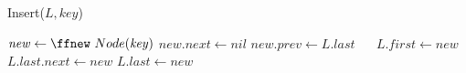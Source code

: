 \documentclass[20pt,a4paper,landscape]{extarticle}
\begin{document}
\SetInd{0em}{0em}
\pagestyle{empty}
\noindent


\begin{procedure}
\LinesNumberedHidden
{}
\caption{Insert($L,key$)}
\BlankLine
$\mathit{new} \leftarrow \ffnew~ Node(\mathit{key})$ \;
$\mathit{new.next} \leftarrow \mathit{nil}$ \;
$\mathit{new.prev} \leftarrow \mathit{L.last}$ \;
 { }{ }
$\mathit{L.first} \leftarrow \mathit{new}$ \;
$\mathit{L.last.next} \leftarrow \mathit{new}$ \;
$\mathit{L.last} \leftarrow \mathit{new}$ \;
\end{procedure}
\end{document}
